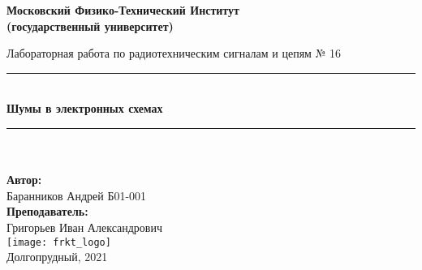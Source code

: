 \newcommand{\HRule}{\rule{\linewidth}{0.7mm}} %
	
	\begin{center}
		\large\textbf{Московский Физико-Технический Институт}\\
		\large\textbf{(государственный университет)}
	
		\vfill
		
		\Large Лабораторная работа по радиотехническим сигналам и цепям № 16\\[0.5cm] %
		
		
		\HRule
		\\[0.4cm]
		{ \huge \bfseries Шумы в электронных схемах}
		\\[0.4cm] %
		\HRule
		\\[0.5cm]
		
		\ \\
	\textbf{\large Автор:} \\	
	\large Баранников Андрей Б01-001\\
	\textbf{\large Преподаватель:} \\
	\large Григорьев Иван Александрович\\
		\vfill
		\hspace*{-0.8 cm}\texttt{[image: frkt\_logo]}\\
		\large Долгопрудный, 2021
	\end{center}

\newpage
\setcounter{page}{2}
\fancyfoot[c]{\thepage}
\fancyhead[R]{}
